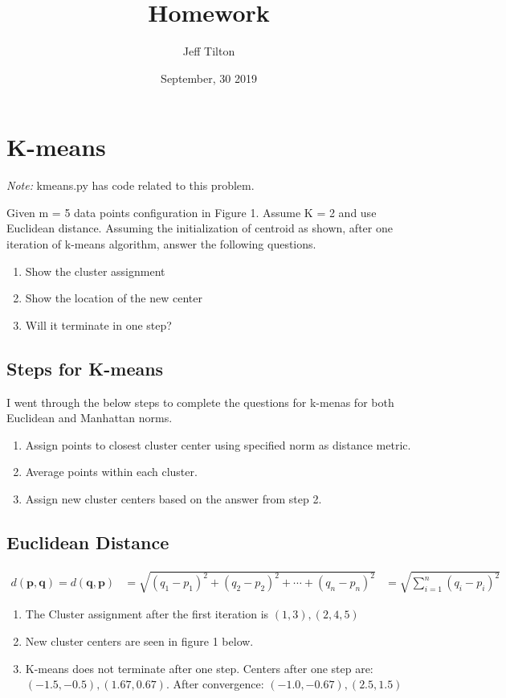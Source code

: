 \documentclass[a4paper]{article}
\title{Homework }
\author{Jeff Tilton}
\date{September, 30 2019}
\begin{document}
\maketitle

\section{K-means}
\textit{Note:} kmeans.py has code related to this problem.

Given m = 5 data points configuration in Figure 1. Assume K = 2 and use Euclidean distance. Assuming the initialization of centroid as shown, after one iteration of k-means algorithm, answer the following questions.

\begin{enumerate}[label=(\alph*)]
\item Show the cluster assignment
\item Show the location of the new center
\item Will it terminate in one step?
\end{enumerate}

\subsection{Steps for K-means}

I went through the below steps to complete the questions for k-menas for both Euclidean and Manhattan norms.

\begin{enumerate}
\item Assign points to closest cluster center using specified norm as distance metric.
\item Average points within each cluster.
\item Assign new cluster centers based on the answer from step 2.
\end{enumerate}



\subsection{Euclidean Distance}


\begin{align}
d(\mathbf{p},\mathbf{q}) = d(\mathbf{q},\mathbf{p}) & = \sqrt{(q_1-p_1)^2 + (q_2-p_2)^2 + \cdots + (q_n-p_n)^2} 
& = \sqrt{\sum_{i=1}^n (q_i-p_i)^2}
\end{align}

\begin{enumerate}[label=(\alph*)]
\item The Cluster assignment after the first iteration is $(1,3), (2,4,5)$
\item New cluster centers are seen in figure 1 below.
\item K-means does not terminate after one step.  Centers after one step are: $(-1.5, -0.5), (1.67, 0.67)$.  After convergence: $(-1.0, -0.67), (2.5, 1.5)$
\end{enumerate}
\end{document}
